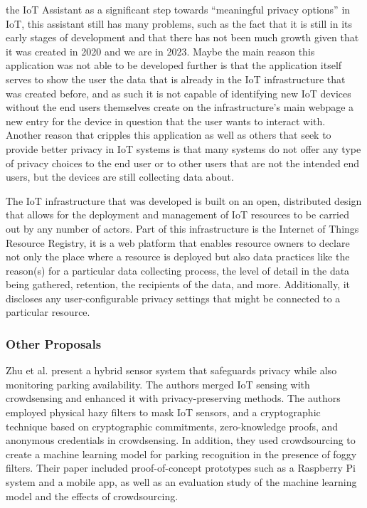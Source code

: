 the IoT Assistant as a significant step towards ``meaningful privacy options''
in IoT, this assistant still has many problems, such as the fact that it
is still in its early stages of development and that there has not been much
growth given that it was created in 2020 and we are in 2023. Maybe the main
reason this application was not able to be developed further is that the
application itself serves to show the user the data that is already in the
IoT infrastructure that was created before, and as such it is not capable
of identifying new IoT devices without the end users themselves create on
the infrastructure's main webpage \cite{DasPersonalized} a new entry for
the device in question that the user wants to interact with. Another reason
that cripples this application as well as others that seek to provide better
privacy in IoT systems is that many systems do not offer any type of privacy
choices to the end user or to other users that are not the intended end
users, but the devices are still collecting data about.

The IoT infrastructure that was developed \cite{DasPersonalized} is built
on an open, distributed design that allows for the deployment and management
of IoT resources to be carried out by any number of actors. Part of this
infrastructure is the Internet of Things Resource Registry, it is a web
platform that enables resource owners to declare not only the place where
a resource is deployed but also data practices like the reason(s) for a
particular data collecting process, the level of detail in the data being
gathered, retention, the recipients of the data, and more. Additionally,
it discloses any user-configurable privacy settings that might be connected
to a particular resource.

\subsubsection{Other Proposals}

Zhu et al. \cite{ZhuIntegrating} present a hybrid sensor system that safeguards
privacy while also monitoring parking availability. The authors merged IoT
sensing with crowdsensing and enhanced it with privacy-preserving methods.
The authors employed physical hazy filters to mask IoT sensors,
and a cryptographic technique based on cryptographic commitments, zero-knowledge
proofs, and anonymous credentials in crowdsensing. In addition, they used
crowdsourcing to create a machine learning model for parking recognition
in the presence of foggy filters. Their paper included proof-of-concept
prototypes such as a Raspberry Pi system and a mobile app, as well as an
evaluation study of the machine learning model and the effects of crowdsourcing.

